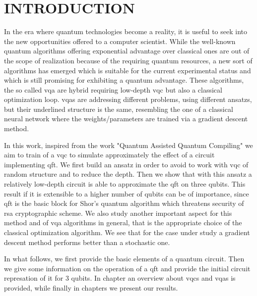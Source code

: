 \documentclass[inscr,ack,preface]{diphdthesis}
\begin{document}
\frontmatter


\mainmatter

\chapter{INTRODUCTION}

In the era where quantum technologies become a reality, it is useful to seek into the 
new opportunities offered to a computer scientist. While the well-known quantum algorithms
offering exponential advantage over classical ones are out of the scope of realization because of
the requiring  quantum resources, a new sort of algorithms  has emerged
which is suitable for the current experimental status and which is still promising for exhibiting a quantum advantage.
These algorithms,  the so called \acrfull{vqa} are hybrid requiring low-depth \acrfull{vqc} but also a classical optimization loop. \acrshort{vqa}s are addressing different problems, using different ansatzs, but their underlined structure
is the same, resembling the one of a classical neural network where the weights/parameters are trained via a gradient descent method. 

In this work, inspired from the work "Quantum Assisted Quantum Compiling"\cite{paper} we aim to train of a \acrshort{vqc} to simulate approximately 
the effect of a circuit implementing \acrfull{qft}. We first build an ansatz in order to avoid to work with \acrshort{vqc} of random structure and to  reduce the depth. Then we show that with this ansatz a relatively low-depth circuit is able to approximate the \acrshort{qft} on three \acrshort{qubit}s. This result if it is extensible to a higher number of \acrshort{qubit}s can be of importance, since \acrshort{qft} is the basic block for Shor's quantum algorithm which threatens security of \acrshort{rsa} cryptographic scheme.
We also study another important aspect for this method and of \acrshort{vqa} algorithms in general, that is the appropriate choice
of the classical optimization algorithm. We see that for the case under study a gradient descent method performs better
than a stochastic one.
 
 In what follows, we first provide the basic elements of a quantum circuit. Then we give some information on
the operation of a \acrshort{qft} and provide the initial circuit represation of it for $3$ \acrshort{qubit}s. In chapter an overview about
\acrshort{vqc}s and \acrshort{vqa}s is provided, while finally in chapters we present our results.
\end{document}
